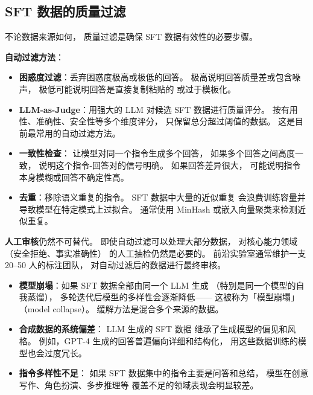 \subsection{SFT 数据的质量过滤}

不论数据来源如何，
质量过滤是确保 SFT 数据有效性的必要步骤。

\textbf{自动过滤方法}：
\begin{itemize}[noitemsep]
  \item \textbf{困惑度过滤}：丢弃困惑度极高或极低的回答。
        极高说明回答质量差或包含噪声，
        极低可能说明回答是直接复制粘贴的
        或过于模板化。
  \item \textbf{LLM-as-Judge}：用强大的 LLM
        对候选 SFT 数据进行质量评分。
        按有用性、准确性、安全性等多个维度评分，
        只保留总分超过阈值的数据。
        这是目前最常用的自动过滤方法。
  \item \textbf{一致性检查}：
        让模型对同一个指令生成多个回答，
        如果多个回答之间高度一致，
        说明这个指令-回答对的信号明确。
        如果回答差异很大，
        可能说明指令本身模糊或回答不确定性高。
  \item \textbf{去重}：移除语义重复的指令。
        SFT 数据中大量的近似重复
        会浪费训练容量并导致模型在特定模式上过拟合。
        通常使用 MinHash 或嵌入向量聚类来检测近似重复。
\end{itemize}

\textbf{人工审核}仍然不可替代。
即使自动过滤可以处理大部分数据，
对核心能力领域（安全拒绝、事实准确性）
的人工抽检仍然是必要的。
前沿实验室通常维护一支 20--50 人的标注团队，
对自动过滤后的数据进行最终审核。

\begin{warnbox}
\begin{itemize}[noitemsep]
  \item \textbf{模型崩塌}：如果 SFT 数据全部由同一个 LLM 生成
       （特别是同一个模型的自我蒸馏），
        多轮迭代后模型的多样性会逐渐降低——
        这被称为「模型崩塌」（model collapse）。
        缓解方法是混合多个来源的数据。
  \item \textbf{合成数据的系统偏差}：
        LLM 生成的 SFT 数据
        继承了生成模型的偏见和风格。
        例如，GPT-4 生成的回答普遍偏向详细和结构化，
        用这些数据训练的模型也会过度冗长。
  \item \textbf{指令多样性不足}：
        如果 SFT 数据集中的指令主要是问答和总结，
        模型在创意写作、角色扮演、多步推理等
        覆盖不足的领域表现会明显较差。
\end{itemize}
\end{warnbox}


